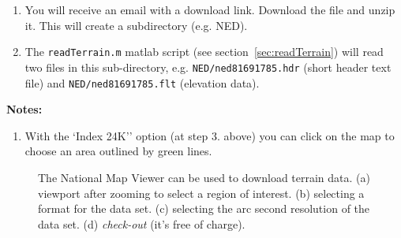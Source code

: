 \documentclass[11pt]{article}
\begin{document}
\begin{enumerate}
   \item You will receive an email with a download link. Download the file and unzip it. This will create
       a subdirectory (e.g. NED). 
   \item The {\tt readTerrain.m} matlab script (see section~\ref{sec:readTerrain}) 
         will read two files in this sub-directory, e.g. {\tt NED/ned\textunderscore81691785.hdr} (short header text file) 
         and {\tt NED/ned\textunderscore81691785.flt} (elevation data). 
\end{enumerate}

{\bf Notes:}
\begin{enumerate}
  \item With the `Index 24K'' option (at step 3. above) you can click on the map to choose an area outlined by  green lines.
\end{enumerate}

{%
\newcommand{\figWidthb}{9.cm}
\newcommand{\trimfigb}[2]{\trimPlot{#1}{#2}{.0}{.0}{.0}{.0}}
% 
\begin{figure}[hbt]
\begin{center}
\end{center}
 \caption{The National Map Viewer can be used to download terrain data.
   (a) viewport after zooming to select a region of interest.
   (b) selecting a format for the data set.
   (c) selecting the arc second resolution of the data set.
   (d) {\em check-out} (it's free of charge). 
     }
  \label{fig:NationalMapViewer}
\end{figure}
%
}%
\end{document}
